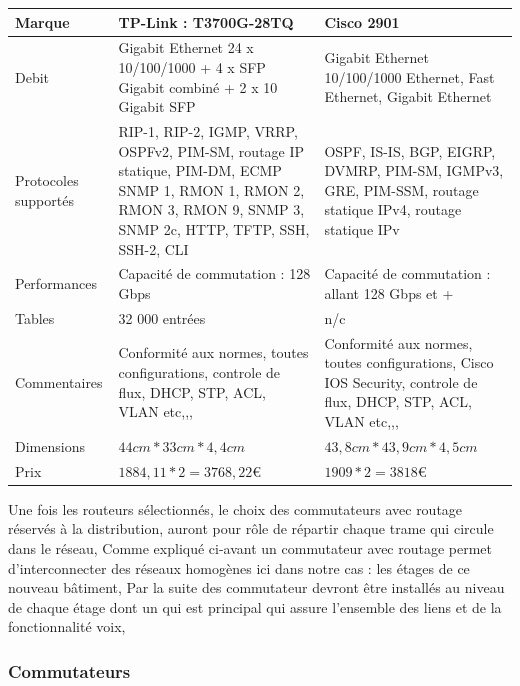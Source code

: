     \begin{center}
        \begin{tabular}{|l|p{5cm}|p{5cm}|}
          \hline
            Marque  &   TP-Link : T3700G-28TQ    &   Cisco 2901 \\
          \hline
            Debit  &
Gigabit Ethernet
24 x 10/100/1000 + 4 x SFP Gigabit combiné + 2 x 10 Gigabit SFP
   &   Gigabit Ethernet
10/100/1000
Ethernet, Fast Ethernet, Gigabit Ethernet \\
          \hline

Protocoles supportés
  &   RIP-1, RIP-2, IGMP, VRRP, OSPFv2, PIM-SM, routage IP statique, PIM-DM, ECMP
SNMP 1, RMON 1, RMON 2, RMON 3, RMON 9, SNMP 3, SNMP 2c, HTTP, TFTP, SSH, SSH-2, CLI   &   OSPF, IS-IS, BGP, EIGRP, DVMRP, PIM-SM, IGMPv3, GRE, PIM-SSM, routage statique IPv4, routage statique IPv \\
          \hline
            Performances  &
Capacité de commutation : 128 Gbps
   &
Capacité de commutation : allant 128 Gbps et +
 \\
          \hline
            Tables  &
32 000 entrées
   &
n/c
 \\
          \hline
            Commentaires  &
Conformité aux normes, toutes configurations, controle de flux, DHCP, STP, ACL, VLAN etc,,,
   &
Conformité aux normes, toutes configurations, Cisco IOS Security, controle de flux, DHCP, STP, ACL, VLAN etc,,,
 \\
          \hline
            Dimensions  &
$44 cm * 33 cm * 4,4 cm$
   &
$43,8 cm * 43,9 cm * 4,5 cm$
 \\
          \hline
            Prix
            &
            $1884,11 * 2 = 3768,22  \euro$
            &
            $1909 * 2 = 3818  \euro$
 \\
          \hline
        \end{tabular}
    \end{center}

Une fois les routeurs sélectionnés, le choix des commutateurs avec routage réservés à la distribution, auront pour rôle de répartir chaque trame qui circule dans le réseau, Comme expliqué ci-avant un commutateur avec routage permet d'interconnecter des réseaux homogènes ici dans notre cas : les étages de ce nouveau bâtiment,
Par la suite des commutateur devront être installés au niveau de chaque étage dont un qui est principal qui assure l'ensemble des liens et de la fonctionnalité voix,


\subsubsection{Commutateurs}

